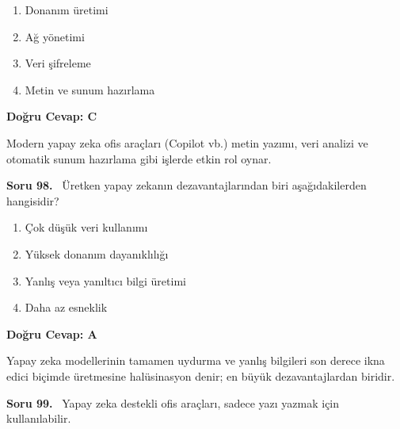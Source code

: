 \documentclass[11pt,a4paper,openany]{book}
\begin{document}
\begin{enumerate}[label=\Alph*), leftmargin=25pt, topsep=4pt, itemsep=2pt]
        \item Donanım üretimi
        \item Ağ yönetimi
        \item Veri şifreleme
        \item Metin ve sunum hazırlama
\end{enumerate}

\vspace{4pt}
\begin{tcolorbox}[title=Cevap ve Açıklama, colback=gray!3!white, colframe=primarycolor!90!black, arc=2mm, fonttitle=\bfseries\sffamily, top=6pt, bottom=6pt]
    \textbf{Doğru Cevap: C}

    \vspace{2pt}
    Modern yapay zeka ofis araçları (Copilot vb.) metin yazımı, veri analizi ve otomatik sunum hazırlama gibi işlerde etkin rol oynar.
\end{tcolorbox}
\vspace{10pt}
\needspace{5cm}
\vspace{8pt}
\noindent\textbf{\large\sffamily Soru 98.} \ Üretken yapay zekanın dezavantajlarından biri aşağıdakilerden hangisidir?

\begin{enumerate}[label=\Alph*), leftmargin=25pt, topsep=4pt, itemsep=2pt]
        \item Çok düşük veri kullanımı
        \item Yüksek donanım dayanıklılığı
        \item Yanlış veya yanıltıcı bilgi üretimi
        \item Daha az esneklik
\end{enumerate}

\vspace{4pt}
\begin{tcolorbox}[title=Cevap ve Açıklama, colback=gray!3!white, colframe=primarycolor!90!black, arc=2mm, fonttitle=\bfseries\sffamily, top=6pt, bottom=6pt]
    \textbf{Doğru Cevap: A}

    \vspace{2pt}
    Yapay zeka modellerinin tamamen uydurma ve yanlış bilgileri son derece ikna edici biçimde üretmesine halüsinasyon denir; en büyük dezavantajlardan biridir.
\end{tcolorbox}
\vspace{10pt}
\needspace{5cm}
\vspace{8pt}
\noindent\textbf{\large\sffamily Soru 99.} \ Yapay zeka destekli ofis araçları, sadece yazı yazmak için kullanılabilir.
\end{document}
